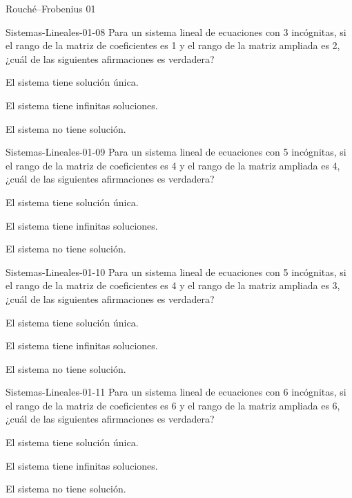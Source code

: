 \documentclass[a4,11pt]{aleph-notas}
\begin{document}
\begin{quiz}{Rouché–Frobenius 01}
\begin{multi}[]%
    {Sistemas-Lineales-01-08}
    Para un sistema lineal de ecuaciones con 3 incógnitas, si el rango de la matriz de coeficientes es 1 y el rango de la matriz ampliada es 2, ¿cuál de las siguientes afirmaciones es verdadera?
    \item El sistema tiene solución única.
    \item El sistema tiene infinitas soluciones.
    \item* El sistema no tiene solución.
\end{multi}

\begin{multi}[]%
    {Sistemas-Lineales-01-09}
    Para un sistema lineal de ecuaciones con 5 incógnitas, si el rango de la matriz de coeficientes es 4 y el rango de la matriz ampliada es 4, ¿cuál de las siguientes afirmaciones es verdadera?
    \item El sistema tiene solución única.
    \item* El sistema tiene infinitas soluciones.
    \item El sistema no tiene solución.
\end{multi}

\begin{multi}[]%
    {Sistemas-Lineales-01-10}
    Para un sistema lineal de ecuaciones con 5 incógnitas, si el rango de la matriz de coeficientes es 4 y el rango de la matriz ampliada es 3, ¿cuál de las siguientes afirmaciones es verdadera?
    \item El sistema tiene solución única.
    \item El sistema tiene infinitas soluciones.
    \item* El sistema no tiene solución.
\end{multi}

\begin{multi}[]%
    {Sistemas-Lineales-01-11}
    Para un sistema lineal de ecuaciones con 6 incógnitas, si el rango de la matriz de coeficientes es 6 y el rango de la matriz ampliada es 6, ¿cuál de las siguientes afirmaciones es verdadera?
    \item* El sistema tiene solución única.
    \item El sistema tiene infinitas soluciones.
    \item El sistema no tiene solución.
\end{multi}


\end{quiz}
\end{document}
